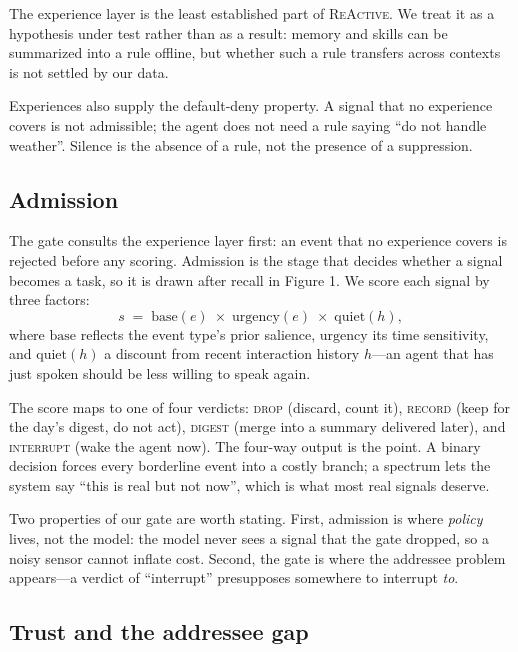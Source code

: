 \documentclass[10pt,a4paper]{article}
\newcommand{\sys}{\textsc{ReActive}}
\begin{document}
The experience layer is the least established part of \sys{}. We treat it as a hypothesis under test rather than as a result: memory and skills can be summarized into a rule offline, but whether such a rule transfers across contexts is not settled by our data.

Experiences also supply the default-deny property. A signal that no
experience covers is not admissible; the agent does not need a rule saying
``do not handle weather''. Silence is the absence of a rule, not the
presence of a suppression.

\subsection{Admission}

The gate consults the experience layer first: an event that no experience covers is rejected before any scoring. Admission is the stage that decides whether a signal becomes a task, so it is drawn after recall in Figure 1. We score each signal by three factors:
\begin{equation}
s \;=\; \mathrm{base}(e)\;\times\;\mathrm{urgency}(e)\;\times\;\mathrm{quiet}(h),
\end{equation}
where $\mathrm{base}$ reflects the event type's prior salience,
$\mathrm{urgency}$ its time sensitivity, and $\mathrm{quiet}(h)$ a discount
from recent interaction history $h$---an agent that has just spoken should be
less willing to speak again.

The score maps to one of four verdicts: \textsc{drop} (discard, count it),
\textsc{record} (keep for the day's digest, do not act), \textsc{digest}
(merge into a summary delivered later), and \textsc{interrupt} (wake the
agent now). The four-way output is the point. A binary decision forces every
borderline event into a costly branch; a spectrum lets the system say
``this is real but not now'', which is what most real signals deserve.

Two properties of our gate are worth stating. First, admission is where
\emph{policy} lives, not the model: the model never sees a signal that the
gate dropped, so a noisy sensor cannot inflate cost. Second, the gate is
where the addressee problem appears---a verdict of ``interrupt'' presupposes
somewhere to interrupt \emph{to}.

\subsection{Trust and the addressee gap}
\end{document}
